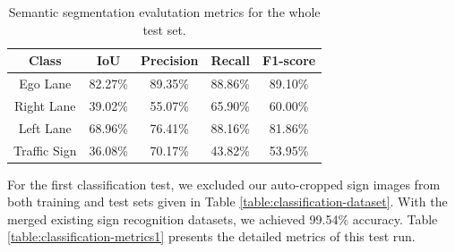 \begin{table}[h]
  \begin{center}
    \caption{Semantic segmentation evalutation metrics for the whole test set.}
    \label{table:segmentation-metrics2}
    \begin{tabular}{|c|c|c|c|c|}
      \hline
      \textbf{Class} & \textbf{IoU} & \textbf{Precision} & \textbf{Recall} & \textbf{F1-score} \\
      \hline
      Ego Lane       & 82.27\%      & 89.35\%            & 88.86\%         & 89.10\% \\
      \hline
      Right Lane     & 39.02\%      & 55.07\%            & 65.90\%         & 60.00\% \\
      \hline
      Left Lane      & 68.96\%      & 76.41\%            & 88.16\%         & 81.86\% \\
      \hline
      Traffic Sign   & 36.08\%      & 70.17\%            & 43.82\%         & 53.95\% \\
      \hline
    \end{tabular}
  \end{center}
\end{table}

For the first classification test, we excluded our auto-cropped sign images
from both training and test sets given in Table
\ref{table:classification-dataset}.  With the merged existing sign recognition
datasets, we achieved 99.54\% accuracy.  Table
\ref{table:classification-metrics1} presents the detailed metrics of this test
run.


